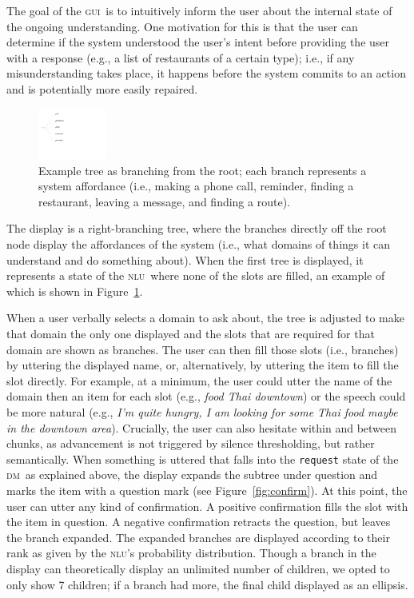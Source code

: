 \documentclass[11pt]{article}
\newcommand{\nlu}[0]{\textsc{nlu}}
\newcommand{\dm}[0]{\textsc{dm}}
\newcommand{\ui}[0]{\textsc{gui}}
\begin{document}
The goal of the \ui\ is to intuitively inform the user about the internal state of the ongoing understanding. One motivation for this is that the user can determine if the system understood the user's intent before providing the user with a response (e.g., a list of restaurants of a certain type); i.e., if any misunderstanding takes place, it happens before the system commits to an action and is potentially more easily repaired. 

\begin{figure}
  \centering
      \includegraphics[width=0.2\textwidth]{figures/diatree-affordances.pdf}	
      \caption{Example tree as branching from the root; each branch represents a system affordance (i.e., making a phone call, reminder, finding a restaurant, leaving a message, and finding a route). \label{fig:affordances}}
\end{figure}

The display is a right-branching tree, where the branches directly off the root node display the affordances of the system (i.e., what domains of things it can understand and do something about). When the first tree is displayed, it represents a state of the \nlu\ where none of the slots are filled, an example of which is shown in Figure~\ref{fig:affordances}. 

When a user verbally selects a domain to ask about, the tree is adjusted to make that domain the only one displayed and the slots that are required for that domain are shown as branches. The user can then fill those slots (i.e., branches) by uttering the displayed name, or, alternatively, by uttering the item to fill the slot directly. For example, at a minimum, the user could utter the name of the domain then an item for each slot (e.g.,  \emph{food Thai downtown}) or the speech could be more natural (e.g., \emph{I'm quite hungry, I am looking for some Thai food maybe in the downtown area}). Crucially, the user can also hesitate within and between chunks, as advancement is not triggered by silence thresholding, but rather semantically.
When something is uttered that falls into the \texttt{request} state of the \dm\ as explained above, the display expands the subtree under question and marks the item with a question mark (see Figure~\ref{fig:confirm}). At this point, the user can utter any kind of confirmation. A positive confirmation fills the slot with the item in question. A negative confirmation retracts the question, but leaves the branch expanded. The expanded branches are displayed according to their rank as given by the \nlu's probability distribution. Though a branch in the display can theoretically display an unlimited number of children, we opted to only show 7 children; if a branch had more, the final child displayed as an ellipsis. 
\end{document}
